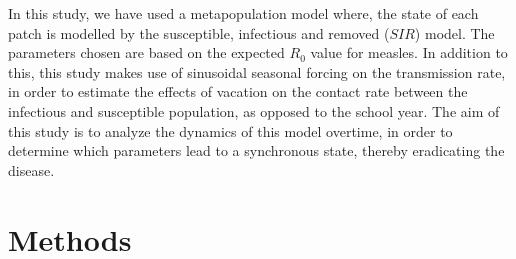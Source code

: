 \documentclass[twocolumn,nofootinbib,showkeys,twoside,floatfix,unsortedaddress,flushbottom,10pt,aps,pra]{report}
\begin{document}
\par
\smallskip \qquad
In this study, we have used a metapopulation model where, the state of each patch is modelled by the susceptible, infectious and removed ($SIR$) model. The parameters chosen are based on the expected $R_0$ value for measles.  In addition to this, this study makes use of sinusoidal seasonal forcing on the transmission rate, in order to estimate the effects of vacation  on the contact rate between the infectious and susceptible population, as opposed to the school year. The aim of this study is to analyze the dynamics of this model overtime, in order to determine which parameters lead to a synchronous state, thereby eradicating the disease. \par
\smallskip

\section{Methods}
\end{document}
